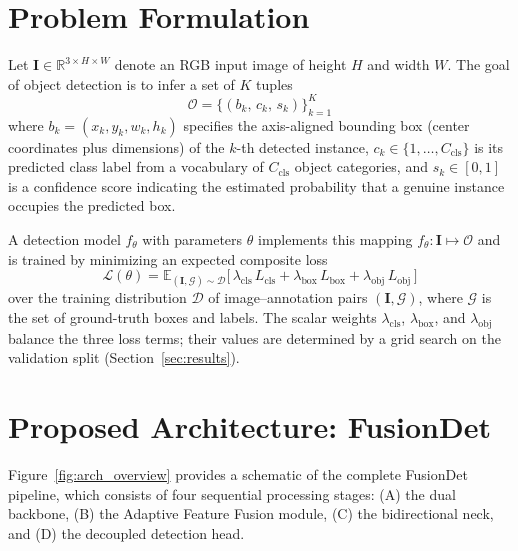 
\section{Problem Formulation}
\label{sec:problem}

Let $\mathbf{I} \in \mathbb{R}^{3 \times H \times W}$ denote an
RGB input image of height $H$ and width $W$. The goal of object
detection is to infer a set of $K$ tuples
\begin{equation}
  \mathcal{O} = \bigl\{(b_k,\, c_k,\, s_k)\bigr\}_{k=1}^{K}
  \label{eq:detection_output}
\end{equation}
where $b_k = (x_k, y_k, w_k, h_k)$ specifies the axis-aligned
bounding box (center coordinates plus dimensions) of the $k$-th
detected instance, $c_k \in \{1, \ldots, C_{\text{cls}}\}$ is its
predicted class label from a vocabulary of $C_{\text{cls}}$ object
categories, and $s_k \in [0,1]$ is a confidence score indicating
the estimated probability that a genuine instance occupies the
predicted box.

A detection model $f_\theta$ with parameters $\theta$ implements this
mapping $f_\theta : \mathbf{I} \mapsto \mathcal{O}$ and is trained by
minimizing an expected composite loss
\begin{equation}
  \mathcal{L}(\theta) =
  \mathbb{E}_{(\mathbf{I},\mathcal{G})\sim\mathcal{D}}
  \bigl[\,
    \lambda_{\text{cls}}\,L_{\text{cls}}
    + \lambda_{\text{box}}\,L_{\text{box}}
    + \lambda_{\text{obj}}\,L_{\text{obj}}
  \,\bigr]
  \label{eq:total_loss}
\end{equation}
over the training distribution $\mathcal{D}$ of image--annotation
pairs $(\mathbf{I}, \mathcal{G})$, where $\mathcal{G}$ is the set of
ground-truth boxes and labels. The scalar weights $\lambda_{\text{cls}}$,
$\lambda_{\text{box}}$, and $\lambda_{\text{obj}}$ balance the three
loss terms; their values are determined by a grid search on the
validation split (Section~\ref{sec:results}).

\section{Proposed Architecture: FusionDet}
\label{sec:arch}

Figure~\ref{fig:arch_overview} provides a schematic of the complete
FusionDet pipeline, which consists of four sequential processing
stages: (A) the dual backbone, (B) the Adaptive Feature Fusion
module, (C) the bidirectional neck, and (D) the decoupled detection
head.

